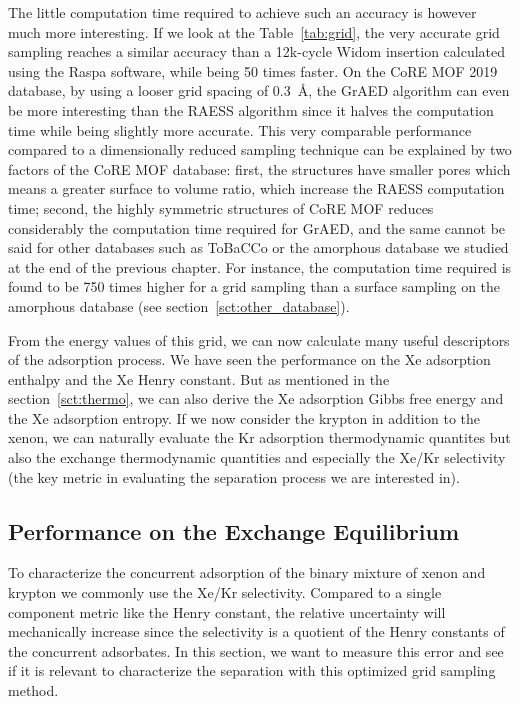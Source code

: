 \documentclass[main]{subfiles}
\begin{document}
The little computation time required to achieve such an accuracy is however much more interesting. If we look at the Table~\ref{tab:grid}, the very accurate grid sampling reaches a similar accuracy than a 12k-cycle Widom insertion calculated using the Raspa software, while being 50 times faster. On the CoRE MOF 2019 database, by using a looser grid spacing of \SI{0.3}{\angstrom}, the GrAED algorithm can even be more interesting than the RAESS algorithm since it halves the computation time while being slightly more accurate. This very comparable performance compared to a dimensionally reduced sampling technique can be explained by two factors of the CoRE MOF database: first, the structures have smaller pores which means a greater surface to volume ratio, which increase the RAESS computation time; second, the highly symmetric structures of CoRE MOF reduces considerably the computation time required for GrAED, and the same cannot be said for other databases such as ToBaCCo or the amorphous database we studied at the end of the previous chapter. For instance, the computation time required is found to be 750 times higher for a grid sampling than a surface sampling on the amorphous database (see section~\ref{sct:other_database}).

From the energy values of this grid, we can now calculate many useful descriptors of the adsorption process. We have seen the performance on the Xe adsorption enthalpy and the Xe Henry constant. But as mentioned in the section~\ref{sct:thermo}, we can also derive the Xe adsorption Gibbs free energy and the Xe adsorption entropy. If we now consider the krypton in addition to the xenon, we can naturally evaluate the Kr adsorption thermodynamic quantites but also the exchange thermodynamic quantities and especially the Xe/Kr selectivity (the key metric in evaluating the separation process we are interested in).


\subsection{Performance on the Exchange Equilibrium}

To characterize the concurrent adsorption of the binary mixture of xenon and krypton we commonly use the Xe/Kr selectivity. Compared to a single component metric like the Henry constant, the relative uncertainty will mechanically increase since the selectivity is a quotient of the Henry constants of the concurrent adsorbates. In this section, we want to measure this error and see if it is relevant to characterize the separation with this optimized grid sampling method.
\end{document}
